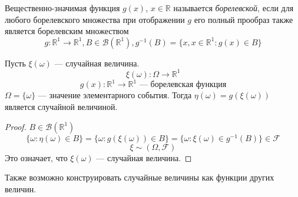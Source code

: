 \begin{definition}
	Вещественно-значимая функция $g(x)$, $x \in \mathbb{R}$ называется \textit{борелевской}, если для любого борелевского множества при отображении $g$ его полный прообраз также является борелевским множеством
	\[
		g : \mathbb{R}^1 \rightarrow \mathbb{R}^1, B \in \mathcal{B} (\mathbb{R}^1), g^{-1} (B) = \{ x, x \in \mathbb{R}^1 : g(x) \in B \}
	\]
\end{definition}
\begin{theorem}
	Пусть $\xi (\omega)$ --- случайная величина.
	\[
		\xi (\omega) : \Omega \rightarrow \mathbb{R}^1
	\]
	\[
		g(x) : \mathbb{R}^1 \rightarrow \mathbb{R}^1 \text{ --- борелевская функция}
	\]
	$\Omega = \{ \omega \}$ --- значение элементарного события. Тогда $\eta (\omega) = g (\xi (\omega))$ является случайной величиной.
\end{theorem}
\begin{proof}
	$B \in \mathcal{B} (\mathbb{R}^1)$
	\[
			\{ \omega : \eta (\omega) \in B \} = \{ \omega : g(\xi(\omega)) \in B \} = \{ \omega : \xi(\omega) \in g^{-1} (B) \} \in \mathcal {F}
	\]
	\[
		\xi \sim (\Omega, \mathcal{F})
	\]
	Это означает, что $\xi(\omega)$ --- случайная величина.
\end{proof}
Также возможно конструировать случайные величины как функции других величин.
